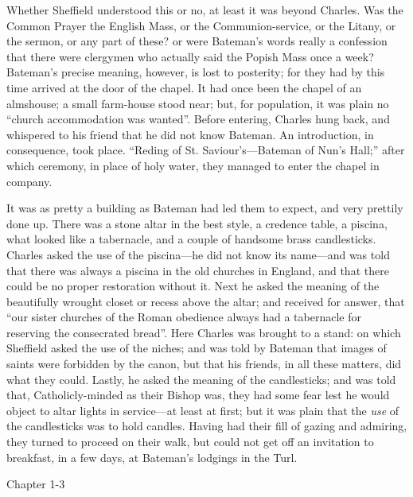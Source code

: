 Whether Sheffield understood this or no, at least it was beyond
Charles. Was the Common Prayer the English Mass, or the
Communion-service, or the Litany, or the sermon, or any part of these?
or were Bateman's words really a confession that there were clergymen
who actually said the Popish Mass once a week? Bateman's precise
meaning, however, is lost to posterity; for they had by this time
arrived at the door of the chapel. It had once been the chapel of an
almshouse; a small farm-house stood near; but, for population, it was
plain no ``church accommodation was wanted''. Before entering,
Charles hung back, and whispered to his friend that he did not know
Bateman. An introduction, in consequence, took place. ``Reding of
St. Saviour's—Bateman of Nun's Hall;'' after which ceremony, in
place of holy water, they managed to enter the chapel in company.

It was as pretty a building as Bateman had led them to expect, and
very prettily done up. There was a stone altar in the best style, a
credence table, a piscina, what looked like a tabernacle, and a couple
of handsome brass candlesticks. Charles asked the use of the piscina—he
did not know its name—and was told that there was always a
piscina in the old churches in England, and that there could be no
proper restoration without it. Next he asked the meaning of the
beautifully wrought closet or recess above the altar; and received for
answer, that ``our sister churches of the Roman obedience always
had a tabernacle for reserving the consecrated bread''. Here
Charles was brought to a stand: on which Sheffield asked the use of
the niches; and was told by Bateman that images of saints were
forbidden by the canon, but that his friends, in all these matters,
did what they could. Lastly, he asked the meaning of the candlesticks;
and was told that, Catholicly-minded as their Bishop was, they had
some fear lest he would object to altar lights in service—at least
at first; but it was plain that the \emph{use} of the candlesticks was
to hold candles. Having had their fill of gazing and admiring, they
turned to proceed on their walk, but could not get off an invitation
to breakfast, in a few days, at Bateman's lodgings in the Turl.

Chapter 1-3


